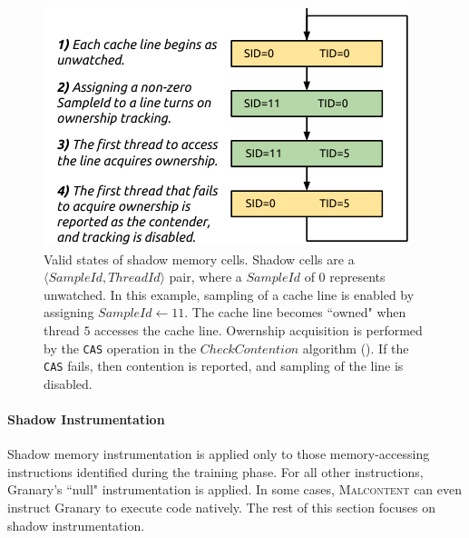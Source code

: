 \documentclass[letterpaper,twocolumn,10pt]{article}
\newcommand{\TextToolname}{Malcontent}
\newcommand{\Toolname}{\textsc{\TextToolname{}}}
\begin{document}
\begin{figure}[t]
\begin{center}
\includegraphics{states.pdf}
\end{center}
\caption{\label{fig:states_of_shadow}Valid states of shadow memory cells. Shadow cells are a $\langle SampleId,ThreadId \rangle$ %
pair, where a $SampleId$ of $0$ represents unwatched. In this example, sampling of a cache line is enabled by assigning %
$SampleId \gets 11$. The cache line becomes ``owned" when thread $5$ accesses the cache line. Owernship acquisition is %
performed by the \texttt{CAS} operation in the $CheckContention$ algorithm (). If the \texttt{CAS} fails, %
then contention is reported, and sampling of the line is disabled.}
%
\end{figure}

\paragraph{Shadow Instrumentation}

Shadow memory instrumentation is applied only to those memory-accessing instructions identified during the training phase. For all
other instructions, Granary's ``null" instrumentation is applied. In some cases, \Toolname{} can even instruct Granary to execute code
natively. The rest of this section focuses on shadow instrumentation.
\end{document}
